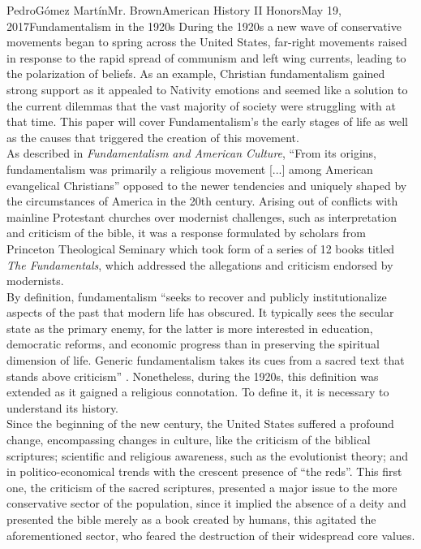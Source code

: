 \documentclass[12pt, letterpaper]{article}
\begin{document}
\begin{mla}{Pedro}{G\'{o}mez Mart\'{i}n}{Mr. Brown}{American History II Honors}{May 19, 2017}{Fundamentalism in the 1920s}
  During the 1920s a new wave of conservative movements began to spring across the United States, far-right movements raised in response to the rapid spread of communism and left wing currents, leading to the polarization of beliefs. As an example, Christian fundamentalism gained strong support as it appealed to Nativity emotions and seemed like a solution to the current dilemmas that the vast majority of society were struggling with at that time. This paper will cover Fundamentalism's the early stages of life as well as the causes that triggered the creation of this movement.\\
  As described in \textit{Fundamentalism and American Culture}, “From its origins, fundamentalism was primarily a religious movement [...] among American evangelical Christians” \parencite{fundamentalism1} opposed to the newer tendencies and uniquely shaped by the circumstances of America in the 20th century. Arising out of conflicts with mainline Protestant churches over modernist challenges, such as interpretation and criticism of the bible, it was a response formulated by scholars from Princeton Theological Seminary which took form of a series of 12 books titled \textit{The Fundamentals}, which addressed the allegations and criticism endorsed by modernists.\parencite{ChristianFundamentalism}\\ 
  By definition, fundamentalism “seeks to recover and publicly institutionalize aspects of the past that modern life has obscured. It typically sees the secular state as the primary enemy, for the latter is more interested in education, democratic reforms, and economic progress than in preserving the spiritual dimension of life. Generic fundamentalism takes its cues from a sacred text that stands above criticism” \parencite{RiseFundamentalism}. Nonetheless, during the 1920s, this definition was extended as it gaigned a religious connotation. To define it, it is necessary to understand its history.\\
  Since the beginning of the new century, the United States suffered a profound change, encompassing changes in culture, like the criticism of the biblical scriptures; scientific and religious awareness, such as the evolutionist theory; and in politico-economical trends with the crescent presence of “the reds”. This first one, the criticism of the sacred scriptures, presented a major issue to the more conservative sector of the population, since it implied the absence of a deity and presented the bible merely as a book created by humans, this agitated the aforementioned sector, who feared the destruction of their widespread core values.\\

\end{mla}
\end{document}
